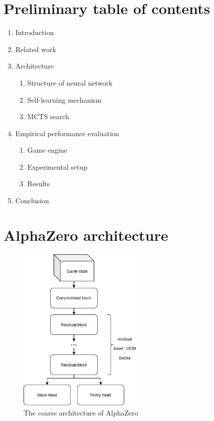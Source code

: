 \documentclass{../lib/llncs}
\begin{document}
\section{Preliminary table of contents}
\begin{enumerate}
  \item Introduction
  \item Related work
  \item Architecture
        \begin{enumerate}
          \item Structure of neural network
          \item Self-learning mechanism
          \item MCTS search
        \end{enumerate}
  \item Empirical performance evaluation
        \begin{enumerate}
          \item Game engine
          \item Experimental setup
          \item Results
        \end{enumerate}
  \item Conclusion
\end{enumerate}

\newpage
\appendix

\section{AlphaZero architecture}

\begin{figure}[!h]
  \centering
  \includegraphics[height=8cm, keepaspectratio]{alphazero_architecture_network.png}
  \caption{The coarse architecture of AlphaZero \cite{silver_mastering_2017}}
  \label{alphazero_architecture}
\end{figure}
\end{document}
